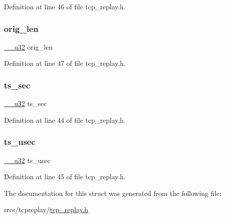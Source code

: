 Definition at line 46 of file tcp\+\_\+replay.\+h.

\mbox{\label{structpcaprec__hdr_a56477cfe7369b217f36fa41132e80926}} 
\subsubsection{\texorpdfstring{orig\+\_\+len}{orig\_len}}
{\footnotesize\ttfamily \hyperlink{asm__types_8h_a3acae9310e2c2e411e800a8a369171c6}{\+\_\+\+\_\+u32} orig\+\_\+len}



Definition at line 47 of file tcp\+\_\+replay.\+h.

\mbox{\label{structpcaprec__hdr_a5d774b9c74b1460b9594a1c604fc9998}} 
\subsubsection{\texorpdfstring{ts\+\_\+sec}{ts\_sec}}
{\footnotesize\ttfamily \hyperlink{asm__types_8h_a3acae9310e2c2e411e800a8a369171c6}{\+\_\+\+\_\+u32} ts\+\_\+sec}



Definition at line 44 of file tcp\+\_\+replay.\+h.

\mbox{\label{structpcaprec__hdr_a8787142fea574b3eee21c13377561e7e}} 
\subsubsection{\texorpdfstring{ts\+\_\+usec}{ts\_usec}}
{\footnotesize\ttfamily \hyperlink{asm__types_8h_a3acae9310e2c2e411e800a8a369171c6}{\+\_\+\+\_\+u32} ts\+\_\+usec}



Definition at line 45 of file tcp\+\_\+replay.\+h.



The documentation for this struct was generated from the following file\+:\begin{DoxyCompactItemize}
\item 
srcs/tcpreplay/\hyperlink{tcp__replay_8h}{tcp\+\_\+replay.\+h}\end{DoxyCompactItemize}
